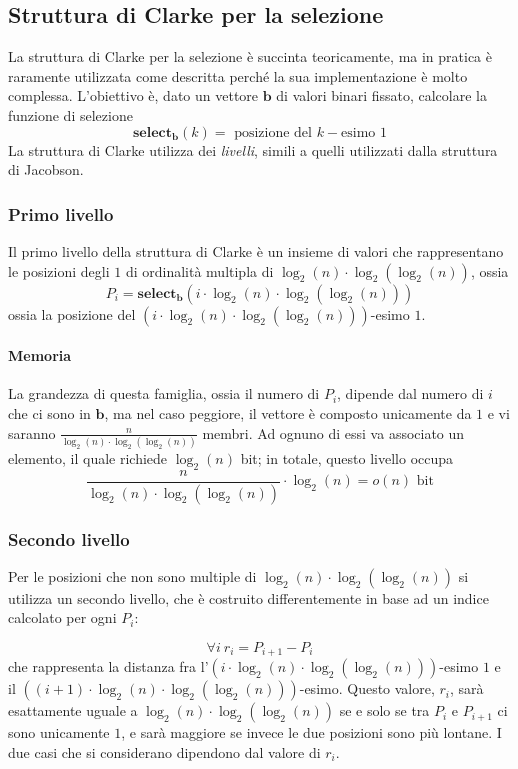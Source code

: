 \subsection{Struttura di Clarke per la selezione}
La struttura di Clarke per la selezione è succinta teoricamente, ma in pratica
è raramente utilizzata come descritta perché la sua implementazione è molto
complessa.
L'obiettivo è, dato un vettore $\mathbf{b}$ di valori binari fissato, calcolare
la funzione di selezione
$$
	\mathbf{select_b}(k) = \text{ posizione del } k-\text{esimo } 1
$$
La struttura di Clarke utilizza dei \textit{livelli}, simili a quelli utilizzati
dalla struttura di Jacobson.

\subsubsection{Primo livello}
Il primo livello della struttura di Clarke è un insieme
di valori che rappresentano le posizioni degli $1$ di ordinalità multipla di
$\log_2(n) \cdot \log_2(\log_2(n))$, ossia
$$
	P_i =  \mathbf{select_b}(i \cdot \log_2(n) \cdot \log_2(\log_2(n)))
$$
ossia la posizione del $(i \cdot \log_2(n) \cdot \log_2(\log_2(n)))$-esimo $1$.

\paragraph{Memoria}
La grandezza di questa famiglia, ossia il numero di $P_i$, dipende dal
numero di $i$ che ci sono in $\mathbf{b}$, ma nel caso peggiore, il vettore
è composto unicamente da $1$ e vi saranno $\frac{n}{\log_2(n) \cdot \log_2(\log_2(n))}$ membri.
Ad ognuno di essi va associato un elemento, il quale richiede $\log_2(n)$ bit;
in totale, questo livello occupa
$$
	\frac{n}{\log_2(n) \cdot \log_2(\log_2(n))} \cdot \log_2(n) = o(n) \text{ bit}
$$

\subsubsection{Secondo livello}
Per le posizioni che non sono multiple di $\log_2(n) \cdot \log_2(\log_2(n))$ si utilizza
un secondo livello, che è costruito differentemente in base ad un indice calcolato
per ogni $P_i$:

$$
	\forall i ~ r_i = P_{i + 1} - P_i
$$
che rappresenta la distanza fra l'$(i \cdot \log_2(n) \cdot \log_2(\log_2(n)))$-esimo $1$
e il $((i+1) \cdot \log_2(n) \cdot \log_2(\log_2(n)))$-esimo. Questo
valore, $r_i$, sarà esattamente uguale a $\log_2(n) \cdot \log_2(\log_2(n))$ se e solo se
tra $P_{i}$ e $P_{i+1}$ ci sono unicamente $1$, e sarà maggiore se invece le
due posizioni sono più lontane.
I due casi che si considerano dipendono dal valore di $r_i$.

